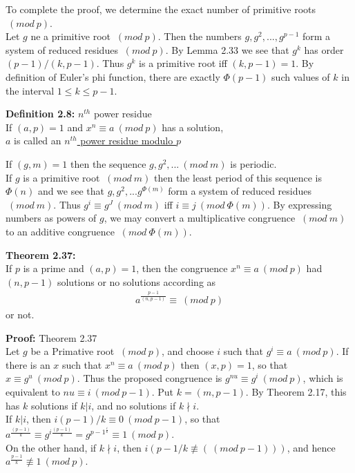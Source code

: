 \documentclass[a4paper]{article}
\begin{document}
To complete the proof, we determine the exact number of primitive roots $\ (mod\ p)$.\\
Let $g$ ne a primitive root $\ (mod\ p)$. Then the numbers $g,g^2,...,g^{p-1}$ form a system of reduced residues $\ (mod\ p)$. By Lemma 2.33 we see that $g^k$ has order $(p-1)/(k,p-1)$. Thus $g^k$ is a primitive root iff $(k,p-1)=1$. By definition of Euler's phi function, there are exactly $\Phi(p-1)$ such values of $k$ in the interval $1\leq k\leq p-1$.

\textbf{Definition 2.8:} $n^{th}$ power residue\\
If $(a,p)=1$ and $x^n \equiv a \ (mod\ p)$ has a solution,\\
$a$ is called an \underline{$n^{th}$ power residue modulo $p$}

If $(g,m)=1$ then the sequence $g,g^2,... \ (mod\ m)$ is periodic.\\
If $g$ is a primitive root $\ (mod\ m)$ then the least period of this sequence is $\Phi(n)$ and we see that $g,g^2,...g^{\Phi(m)}$ form a system of reduced residues $\ (mod\ m)$. Thus $g^i \equiv g^J \ (mod\ m)$ iff $i \equiv j \ (mod\ \Phi(m))$. By expressing numbers as powers of $g$, we may convert a multiplicative congruence $\ (mod\ m)$ to an additive congruence $\ (mod\ \Phi(m))$.

\textbf{Theorem 2.37:}\\
If $p$ is a prime and $(a,p)=1$, then the congruence $x^n \equiv a \ (mod\ p)$ had $(n,p-1)$ solutions or no solutions according as
\begin{align*}
    a^{\frac{p-1}{(n,p-1)}} \equiv \ (mod\ p)
\end{align*}
or not.

\textbf{Proof:} Theorem 2.37\\
Let $g$ be a Primative root $\ (mod\ p)$, and choose $i$ such that $g^i \equiv a \ (mod\ p)$. If there is an $x$ such that $x^n \equiv a \ (mod\ p)$ then $(x,p)=1$, so that $x \equiv  g^u \ (mod\ p)$. Thus the proposed congruence is $g^{nu} \equiv g^i \ (mod\ p)$, which is equivalent to $nu \equiv i \ (mod\ p-1)$. Put $k = (m,p-1)$. By Theorem 2.17, this has $k$ solutions if $k|i$, and no solutions if $k\nmid i$.\\
If $k|i$, then $i(p-1)/k \equiv 0 \ (mod\ p-1)$, so that $a^\frac{(p-1)}{k} \equiv g^{i\frac{(p-1)}{k}} = g^{p-1}^{\frac{i}{k}} \equiv 1 \ (mod\ p)$.\\
On the other hand, if $k\nmid i$, then $i(p-1/k \not \equiv (\ (mod\ p-1)))$, and hence $a^{\frac{p-1}{k}}\not \equiv 1 \ (mod\ p)$.
\end{document}
